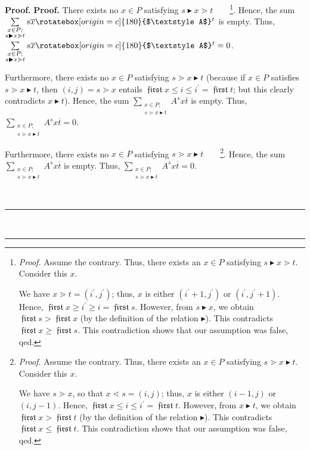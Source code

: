 \documentclass[numbers=enddot,12pt,final,onecolumn,notitlepage]{scrartcl}%
\theoremstyle{definition}
\newenvironment{verlong}{}{}
\newenvironment{vershort}{}{}
\newcommand{\upslack}{\mathchoice{\rotatebox[origin=c]{180}{$\displaystyle A$}}{\rotatebox[origin=c]{180}{$\textstyle A$}}{\rotatebox[origin=c]{180}{$\scriptstyle A$}}{\rotatebox[origin=c]{180}{$\scriptscriptstyle A$}}}
\newcommand{\downslack}{A}
\DeclareMathOperator{\first}{\mathfrak{first}}
\newenvironment{proof}[1][Proof]{\noindent\textbf{#1.} }{\ \rule{0.5em}{0.5em}}
\let\sumnonlimits\sum
\renewcommand{\sum}{\sumnonlimits\limits}
\begin{document}
\begin{proof}
\begin{proof}
\begin{verlong}
There exists no $x\in P$ satisfying $s\blacktriangleright x\gtrdot
t$\ \ \ \ \footnote{\textit{Proof.} Assume the contrary. Thus, there exists an
$x\in P$ satisfying $s\blacktriangleright x\gtrdot t$. Consider this $x$.
\par
We have $x\gtrdot t=\left(  i^{\prime},j^{\prime}\right)  $; thus, $x$ is
either $\left(  i^{\prime}+1,j^{\prime}\right)  $ or $\left(  i^{\prime
},j^{\prime}+1\right)  $. Hence, $\first x\geq i^{\prime}\geq i=\first s$.
However, from $s\blacktriangleright x$, we obtain $\first s>\first x$ (by the
definition of the relation $\blacktriangleright$). This contradicts $\first
x\geq\first s$. This contradiction shows that our assumption was false, qed.}.
Hence, the sum $\sum_{\substack{x\in P;\\s\blacktriangleright x\gtrdot
t}}s\overline{x}\upslack^{t}$ is empty. Thus, $\sum_{\substack{x\in
P;\\s\blacktriangleright x\gtrdot t}}s\overline{x}\upslack^{t}=0$.
\end{verlong}

\begin{vershort}
Furthermore, there exists no $x\in P$ satisfying $s\gtrdot
x\blacktriangleright t$ (because if $x\in P$ satisfies $s\gtrdot
x\blacktriangleright t$, then $\left(  i,j\right)  =s\gtrdot x$ entails
$\first x\leq i\leq i^{\prime}=\first t$; but this clearly contradicts
$x\blacktriangleright t$). Hence, the sum $\sum_{\substack{x\in P;\\s\gtrdot
x\blacktriangleright t}}\downslack^{s}x\overline{t}$ is empty. Thus,
$\sum_{\substack{x\in P;\\s\gtrdot x\blacktriangleright t}}\downslack^{s}%
x\overline{t}=0$.
\end{vershort}

\begin{verlong}
Furthermore, there exists no $x\in P$ satisfying $s\gtrdot
x\blacktriangleright t$\ \ \ \ \footnote{\textit{Proof.} Assume the contrary.
Thus, there exists an $x\in P$ satisfying $s\gtrdot x\blacktriangleright t$.
Consider this $x$.
\par
We have $s\gtrdot x$, so that $x\lessdot s=\left(  i,j\right)  $; thus, $x$ is
either $\left(  i-1,j\right)  $ or $\left(  i,j-1\right)  $. Hence, $\first
x\leq i\leq i^{\prime}=\first t$. However, from $x\blacktriangleright t$, we
obtain $\first x>\first t$ (by the definition of the relation
$\blacktriangleright$). This contradicts $\first x\leq\first t$. This
contradiction shows that our assumption was false, qed.}. Hence, the sum
$\sum_{\substack{x\in P;\\s\gtrdot x\blacktriangleright t}}\downslack^{s}%
x\overline{t}$ is empty. Thus, $\sum_{\substack{x\in P;\\s\gtrdot
x\blacktriangleright t}}\downslack^{s}x\overline{t}=0$.
\end{verlong}


\end{proof}
\end{proof}
\end{document}
